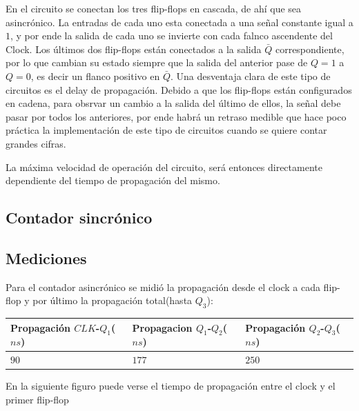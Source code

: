 En el circuito se conectan los tres flip-flops en cascada, de ahí que sea asincrónico. La entradas de cada uno esta conectada a una señal constante igual a $1$, y por ende la salida de cada uno se invierte con cada falnco ascendente del Clock. Los últimos dos flip-flops están conectados a la salida $\bar{Q}$ correspondiente, por lo que cambian su estado siempre que la salida del anterior pase de $Q = 1$ a $Q = 0$, es decir un flanco positivo en $\bar{Q}$. Una desventaja clara de este tipo de circuitos es el delay de propagación. Debido a que los flip-flops están configurados en cadena, para obsrvar un cambio a la salida del último de ellos, la señal debe pasar por todos los anteriores, por ende habrá un retraso medible que hace poco práctica la implementación de este tipo de circuitos cuando se quiere contar grandes cifras. 


La máxima velocidad de operación del circuito, será entonces directamente dependiente del tiempo de propagación del mismo. 


\subsection{Contador sincrónico}


\subsection{Mediciones}

Para el contador asincrónico se midió la propagación desde el clock a cada flip-flop y por último la propagación total(hasta $Q_3$):

\begin{table}[H]
\centering
\begin{tabular}{lll}\hline
Propagación $CLK$-$Q_1$($ns$) & Propagacion $Q_1$-$Q_2$($ns$) & Propagación $Q_2$-$Q_3$($ns$)\\ \hline
$90$  &       $177$ & $250$  \\ \hline

\end{tabular}
\end{table}

En la siguiente figuro puede verse el tiempo de propagación entre el clock y el primer flip-flop

